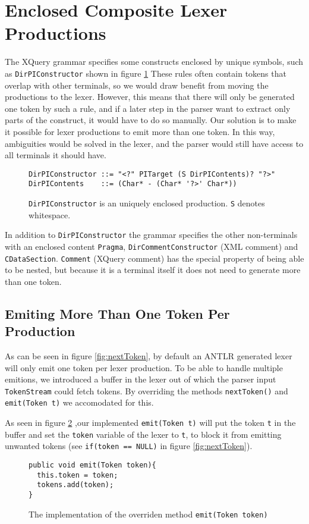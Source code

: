 \section{Enclosed Composite Lexer Productions}
\label{sect:rewriteGrammar:enclosedComposite}
 The XQuery grammar specifies some constructs enclosed by unique symbols, such as \verb!DirPIConstructor! shown in figure \ref{fig:pragma} These rules often contain tokens that overlap with other terminals, so we would draw benefit from moving the productions to the lexer. However, this means that there will only be generated one token by such a rule, and if a later step in the parser want to extract only parts of the construct, it would have to do so manually. Our solution is to make it possible for lexer productions to emit more than one token. In this way, ambiguities would be solved in the lexer, and the parser would still have access to all terminals it should have.

\begin{figure}[h!]
\begin{verbatim}
DirPIConstructor ::= "<?" PITarget (S DirPIContents)? "?>"
DirPIContents    ::= (Char* - (Char* '?>' Char*))
\end{verbatim}
\label{fig:pragma}
\caption[An enclosed production]{\texttt{DirPIConstructor} is an uniquely enclosed production. \texttt{S} denotes whitespace.}
\end{figure}

In addition to \verb!DirPIConstructor! the grammar specifies the other non-terminals with an enclosed content \verb!Pragma!,  \verb!DirCommentConstructor! (XML comment) and \verb!CDataSection!. \verb!Comment! (XQuery comment) has the special property of being able to be nested, but because it is a terminal itself it does not need to generate more than one token.

\subsection{Emiting More Than One Token Per Production}

As can be seen in figure \ref{fig:nextToken}, by default an ANTLR generated lexer will only emit one token per lexer production. To be able to handle multiple emitions, we introduced a buffer in the lexer out of which the parser input \verb!TokenStream! could fetch tokens. By overriding the methods \verb!nextToken()! and \verb!emit(Token t)! we accomodated for this. 

As seen in figure \ref{fig:emitToken} ,our implemented \verb!emit(Token t)! will put the token \verb!t! in the buffer and set the \verb!token! variable of the lexer to \verb!t!, to block it from emitting unwanted tokens (see \verb!if(token == NULL)! in figure \ref{fig:nextToken}).
\begin{figure}[h!]
\begin{verbatim}
public void emit(Token token){
  this.token = token;
  tokens.add(token);
}
\end{verbatim}
\caption[The overridden \texttt{emit(Token t)}]{The implementation of the overriden method \texttt{emit(Token token)}}
\label{fig:emitToken}
\end{figure}

